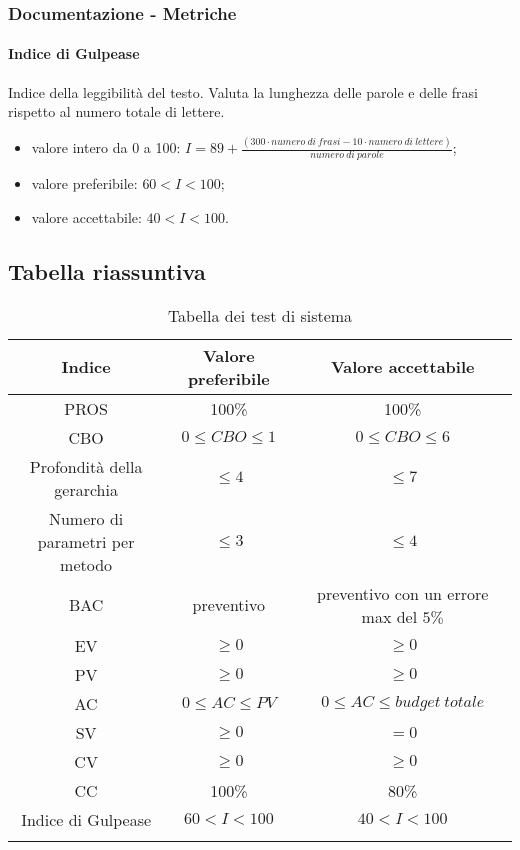 		\subsubsection{Documentazione - Metriche}
		\paragraph{Indice di Gulpease}
		Indice della leggibilità del testo. Valuta la lunghezza delle parole e delle frasi rispetto al numero totale di lettere.
		\begin{itemize}
		\item valore intero da 0 a 100: $I = 89 + \frac{(300 \cdot numero \ di \ frasi - 10 \cdot numero \ di \ lettere)}{numero \ di \ parole}$;
		\item valore preferibile: $60 < I < 100$;
		\item valore accettabile: $40 < I < 100$.
		\end{itemize}
		
	\subsection{Tabella riassuntiva}
		\begin{center}
		\begin{longtable}{|c|c|c|}
			\hline
			\rowcolor{lighter-grayer}
			\textbf{Indice} & \textbf{Valore preferibile} & \textbf{Valore accettabile}  \\ 
						
			\hline
			\endhead
			
			\hline
			PROS & 100\% & 100\% \\
			\hline
			CBO & $0 \leq CBO \leq 1$ & $0 \leq CBO \leq 6$ \\
			\hline
			Profondità della gerarchia & $\leq 4$ & $\leq 7$ \\
			\hline
			Numero di parametri per metodo & $\leq 3$ & $\leq 4$ \\
			\hline
			BAC & preventivo & preventivo con un errore max del $5\%$ \\
			\hline
			EV & $\geq 0$ & $\geq 0$ \\
			\hline
			PV & $\geq 0$ & $\geq 0$ \\			
			\hline
			AC & $0 \leq AC \le PV$ & $0 \leq AC \leq budget \ totale$ \\			
			\hline
			SV & $\ge 0$ & $= 0$ \\			
			\hline
			CV & $\ge 0$ & $\geq 0$ \\		
			\hline
			CC & 100\% & 80\% \\
			\hline
			Indice di Gulpease & $60 < I < 100$ & $40 < I < 100$ \\
			\hline
				
			\hiderowcolors
			\caption{Tabella dei test di sistema}		
		\end{longtable}	
	\end{center}

